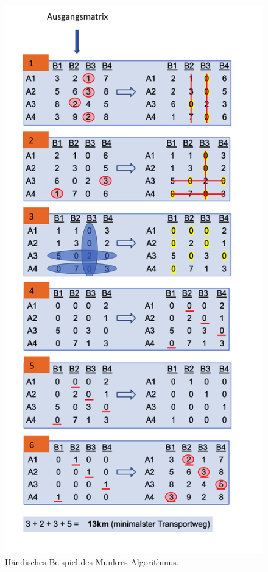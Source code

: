 \begin{figure}
\centering
\includegraphics[width=14cm]{papers/munkres/figures/Ungarische_Methode_Beispiel}
\caption{Händisches Beispiel des Munkres Algorithmus.}
\label{munkres:Vr2}
\end{figure}
